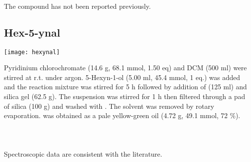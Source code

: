 \\[1\baselineskip]
\\[1\baselineskip]
\\[1\baselineskip]
The compound has not been reported previously.

\subsection{Hex-5-ynal }


\begin{scheme}[H]
	\begin{center}
		\texttt{[image: hexynal]}
	\end{center}
\end{scheme}

Pyridinium chlorochromate (14.6 g, 68.1 mmol, 1.50 eq) and DCM (500 ml) were stirred at r.t. under argon. 5-Hexyn-1-ol  (5.00 ml, 45.4 mmol, 1 eq.) was added and the reaction mixture was stirred for 5 h followed by addition of  (125 ml) and silica gel (62.5 g). The suspension was stirred for 1 h then filtered through a pad of silica (100 g) and washed with . The solvent was removed by rotary evaporation.  was obtained as a pale yellow-green oil (4.72 g, 49.1 mmol, 72 \%).
\\[1\baselineskip]
\\[1\baselineskip]
\\[1\baselineskip]
\\[1\baselineskip]
Spectroscopic data are consistent with the literature\cite{Kocsis2012}.

